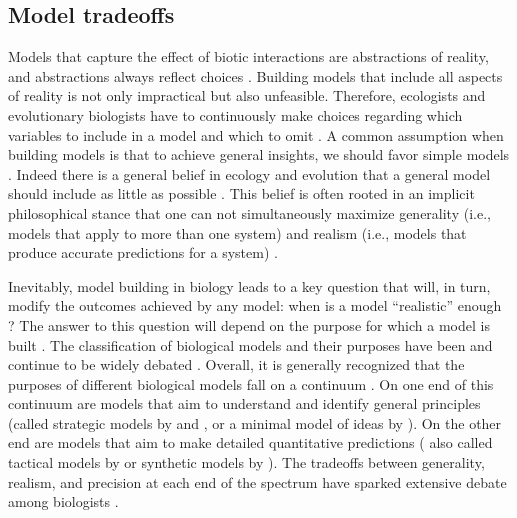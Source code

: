 \begin{refsection}
\subsection*{Model tradeoffs}
Models that capture the effect of biotic interactions are abstractions of reality, and abstractions always reflect choices \citep{levins2006strategies}. Building models that include all aspects of reality is not only impractical but also unfeasible.  Therefore, ecologists and evolutionary biologists have to continuously make choices regarding which variables to include in a model and which to omit \citep{odenbaugh2005idealized}. A common assumption when building models is that to achieve general insights, we should favor simple models \citep{evans2013simple}. Indeed there is a general belief in ecology and evolution that a general model should include as little as possible \citep{holling1966strategy,may2019stability,roughgarden2018adaptive}. This belief is often rooted in an implicit philosophical stance that one can not simultaneously maximize generality (i.e., models that apply to more than one system) and realism (i.e., models that produce accurate predictions for a system) \citep{levins1966strategy,levins1993response}.


Inevitably, model building in biology leads to a key question that will, in turn, modify the outcomes achieved by any model: when is a model ``realistic'' enough \citep{stouffer2019all}? The answer to this question will depend on the purpose for which a model is built \citep{odenbaugh2005idealized,levins2006strategies}. The classification of biological models and their purposes have been and continue to be widely debated \citep{holling1966strategy,may2019stability,lewontin1963models,levins1966strategy,orzack1993critical,levins1993response,odenbaugh2005idealized,weisberg2006forty,evans2013simple}. Overall, it is generally recognized that the purposes of different biological models fall on a continuum \citep{levins1993response,evans2013simple,servedio2014not}. On one end of this continuum are models that aim to understand and identify general principles (called strategic models by \citet{holling1966strategy} and \citet{may2019stability}, or a minimal model of ideas by \citet{roughgarden2018adaptive}). On the other end are models that aim to make detailed quantitative predictions ( also called tactical models by \citet{holling1966strategy} or synthetic models by \citet{roughgarden2018adaptive}). The tradeoffs between generality, realism, and precision at each end of the spectrum have sparked extensive debate among biologists \citep{levins1966strategy,orzack1993critical,levins1993response,weisberg2006forty}.


\end{refsection}
